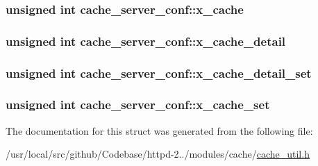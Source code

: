 \subsubsection[{\texorpdfstring{x\+\_\+cache}{x_cache}}]{\setlength{\rightskip}{0pt plus 5cm}unsigned {\bf int} cache\+\_\+server\+\_\+conf\+::x\+\_\+cache}\hypertarget{structcache__server__conf_a0de4dc2e226700211b9a0ef82c9823c5}{}\label{structcache__server__conf_a0de4dc2e226700211b9a0ef82c9823c5}
\subsubsection[{\texorpdfstring{x\+\_\+cache\+\_\+detail}{x_cache_detail}}]{\setlength{\rightskip}{0pt plus 5cm}unsigned {\bf int} cache\+\_\+server\+\_\+conf\+::x\+\_\+cache\+\_\+detail}\hypertarget{structcache__server__conf_af3b22a332ba195b7e918b7c47ff4b390}{}\label{structcache__server__conf_af3b22a332ba195b7e918b7c47ff4b390}
\subsubsection[{\texorpdfstring{x\+\_\+cache\+\_\+detail\+\_\+set}{x_cache_detail_set}}]{\setlength{\rightskip}{0pt plus 5cm}unsigned {\bf int} cache\+\_\+server\+\_\+conf\+::x\+\_\+cache\+\_\+detail\+\_\+set}\hypertarget{structcache__server__conf_a085f98898aef58723b61aed6d52bb96c}{}\label{structcache__server__conf_a085f98898aef58723b61aed6d52bb96c}
\subsubsection[{\texorpdfstring{x\+\_\+cache\+\_\+set}{x_cache_set}}]{\setlength{\rightskip}{0pt plus 5cm}unsigned {\bf int} cache\+\_\+server\+\_\+conf\+::x\+\_\+cache\+\_\+set}\hypertarget{structcache__server__conf_aefa876cdd2e22beb12a23bd327efbfa4}{}\label{structcache__server__conf_aefa876cdd2e22beb12a23bd327efbfa4}


The documentation for this struct was generated from the following file\+:\begin{DoxyCompactItemize}
\item 
/usr/local/src/github/\+Codebase/httpd-\/2../modules/cache/\hyperlink{cache__util_8h}{cache\+\_\+util.\+h}\end{DoxyCompactItemize}
